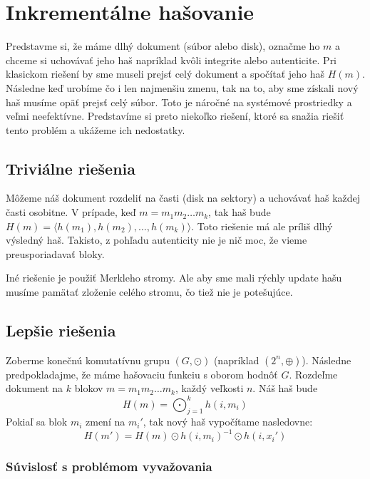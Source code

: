 \section{Inkrementálne hašovanie}

Predstavme si, že máme dlhý dokument (súbor alebo disk),
označme ho $m$ a chceme si uchovávať jeho haš napríklad kvôli
integrite alebo autenticite. Pri klasickom riešení
by sme museli prejsť celý dokument a spočítať jeho 
haš $H(m)$. Následne keď urobíme čo i len najmenšiu
zmenu, tak na to, aby sme získali nový haš musíme opäť
prejsť celý súbor. Toto je náročné na systémové prostriedky
a veľmi neefektívne. Predstavíme si preto niekoľko riešení, ktoré sa
snažia riešiť tento problém a ukážeme ich nedostatky.

\subsection{Triviálne riešenia}

Môžeme náš dokument rozdeliť na časti (disk na sektory)
a uchovávať haš každej časti osobitne. V prípade, keď
$m = m_1 m_2 \dots m_k$, tak haš bude 
$H(m) = \langle h(m_1), h(m_2), \dots, h(m_k) \rangle$.
Toto riešenie má ale príliš dlhý výsledný haš.
Takisto, z pohľadu autenticity nie je nič moc, že vieme
preusporiadavať bloky.

Iné riešenie je použiť Merkleho stromy. Ale aby
sme mali rýchly update hašu musíme pamätať zloženie celého stromu,
čo tiež nie je potešujúce.


\subsection{Lepšie riešenia}

Zoberme konečnú komutatívnu grupu $(G, \odot)$ (napríklad $(2^n, \oplus)$).
Následne predpokladajme, že máme hašovaciu funkciu s oborom hodnôť $G$.
Rozdeľme dokument na $k$ blokov $m = m_1 m_2 \dots m_k$, každý
veľkosti $n$. Náš haš bude 
\begin{equation*}
    H(m) = \bigodot_{j=1}^k h(i, m_i)
\end{equation*}
Pokiaľ sa blok $m_i$ zmení na $m_i'$, tak nový haš vypočítame
nasledovne:
\begin{equation*}
    H(m') = H(m) \odot h(i, m_i)^{-1} \odot h(i, x_i')
\end{equation*}

\subsubsection{Súvislosť s problémom vyvažovania}

